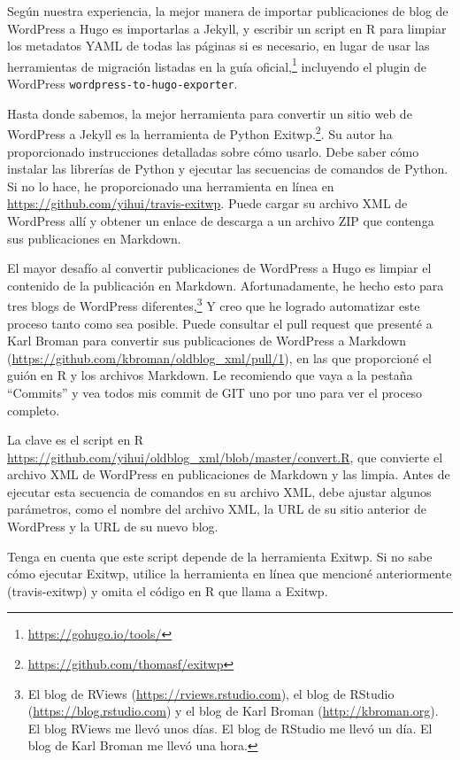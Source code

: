 \documentclass[12pt,]{krantz}
\renewcommand{\href}[2]{#2\footnote{\url{#1}}}
\theoremstyle{definition}
\theoremstyle{definition}
\theoremstyle{definition}
\theoremstyle{remark}
\begin{document}
Según nuestra experiencia, la mejor manera de importar publicaciones de
blog de WordPress a Hugo es importarlas a Jekyll, y
escribir un script en R para limpiar los metadatos YAML de todas las
páginas si es necesario, en lugar de usar las herramientas de migración
listadas en la \href{https://gohugo.io/tools/}{guía oficial,} incluyendo
el plugin de WordPress \texttt{wordpress-to-hugo-exporter}.

Hasta donde sabemos, la mejor herramienta para convertir un sitio web de
WordPress a Jekyll es la herramienta de Python
\href{https://github.com/thomasf/exitwp}{Exitwp.}. Su autor ha
proporcionado instrucciones detalladas sobre cómo usarlo. Debe saber
cómo instalar las librerías de Python y ejecutar las secuencias de
comandos de Python. Si no lo hace, he proporcionado una herramienta en
línea en \url{https://github.com/yihui/travis-exitwp}. Puede cargar su
archivo XML de WordPress allí y obtener un enlace de descarga a un
archivo ZIP que contenga sus publicaciones en Markdown.

El mayor desafío al convertir publicaciones de WordPress a Hugo es
limpiar el contenido de la publicación en Markdown. Afortunadamente, he
hecho esto para tres blogs de WordPress diferentes,\footnote{El blog de
  RViews (\url{https://rviews.rstudio.com}), el blog de RStudio
  (\url{https://blog.rstudio.com}) y el blog de Karl Broman
  (\url{http://kbroman.org}). El blog RViews me llevó unos días. El blog
  de RStudio me llevó un día. El blog de Karl Broman me llevó una hora.}
Y creo que he logrado automatizar este proceso tanto como sea posible.
Puede consultar el pull request que presenté a Karl Broman para
convertir sus publicaciones de WordPress a Markdown
(\url{https://github.com/kbroman/oldblog_xml/pull/1}), en las que
proporcioné el guión en R y los archivos Markdown. Le recomiendo que
vaya a la pestaña ``Commits'' y vea todos mis commit de GIT uno por uno
para ver el proceso completo.

La clave es el script en R
\url{https://github.com/yihui/oldblog_xml/blob/master/convert.R}, que
convierte el archivo XML de WordPress en publicaciones de Markdown y las
limpia. Antes de ejecutar esta secuencia de comandos en su archivo XML,
debe ajustar algunos parámetros, como el nombre del archivo XML, la URL
de su sitio anterior de WordPress y la URL de su nuevo blog.

Tenga en cuenta que este script depende de la herramienta Exitwp. Si no
sabe cómo ejecutar Exitwp, utilice la herramienta en línea que mencioné
anteriormente (travis-exitwp) y omita el código en R que llama a Exitwp.
\end{document}

